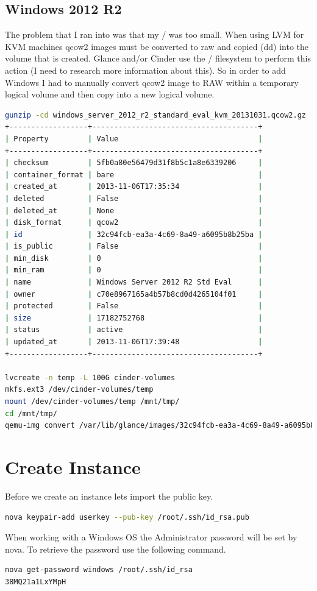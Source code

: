 \documentclass[11pt,letterpaper,oneside]{book}
\begin{document}
\subsection{Windows 2012 R2}
The problem that I ran into was that my / was too small. When using LVM for KVM machines qcow2
images must be converted to raw and copied (dd) into the volume that is created. Glance and/or Cinder
use the / filesystem to perform this action (I need to research more information about this). So in order
to add Windows I had to manually convert qcow2 image to RAW within a temporary logical volume
and then copy into a new logical volume.
\begin{lstlisting}[caption={Windows 2012 R2 Image Create},language=bash]
gunzip -cd windows_server_2012_r2_standard_eval_kvm_20131031.qcow2.gz | glance image-create --name "Windows Server 2012 R2 Std Eval" --disk-format=qcow2 --container-format=bare 
+------------------+--------------------------------------+ 
| Property         | Value                                | 
+------------------+--------------------------------------+ 
| checksum         | 5fb0a80e56479d31f8b5c1a8e6339206     | 
| container_format | bare                                 | 
| created_at       | 2013-11-06T17:35:34                  | 
| deleted          | False                                | 
| deleted_at       | None                                 | 
| disk_format      | qcow2                                | 
| id               | 32c94fcb-ea3a-4c69-8a49-a6095b8b25ba | 
| is_public        | False                                | 
| min_disk         | 0                                    | 
| min_ram          | 0                                    | 
| name             | Windows Server 2012 R2 Std Eval      | 
| owner            | c70e8967165a4b57b8cd0d4265104f01     | 
| protected        | False                                | 
| size             | 17182752768                          | 
| status           | active                               | 
| updated_at       | 2013-11-06T17:39:48                  | 
+------------------+--------------------------------------+ 

lvcreate -n temp -L 100G cinder-volumes
mkfs.ext3 /dev/cinder-volumes/temp
mount /dev/cinder-volumes/temp /mnt/tmp/ 
cd /mnt/tmp/ 
qemu-img convert /var/lib/glance/images/32c94fcb-ea3a-4c69-8a49-a6095b8b25ba -O raw ./windows.raw
\end{lstlisting}
\section{Create Instance}
Before we create an instance lets import the public key.
\begin{lstlisting}[caption={Add public key},language=bash]
nova keypair-add userkey --pub-key /root/.ssh/id_rsa.pub
\end{lstlisting}
When working with a Windows OS the Administrator password will be set by nova.  To retrieve the password use the following command. 
\begin{lstlisting}[caption={Windows administrator password},language=bash]
nova get-password windows /root/.ssh/id_rsa 
38MQ21a1LxYMpH
\end{lstlisting}
\appendix
\end{document}
